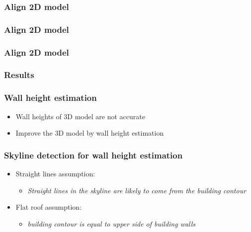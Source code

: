 \documentclass{beamer}
\begin{document}
\frame
{
	\frametitle{Align 2D model}
}


\frame
{
	\frametitle{Align 2D model}
}


\frame
{
	\frametitle{Align 2D model}
}

\frame
{
	\frametitle{Results}
}

\frame
{
	\frametitle{Wall height estimation}
	\begin{itemize}
	\item <+-| alert@+> Wall heights of 3D model are not accurate
	\item <+-| alert@+> Improve the 3D model by wall height estimation
	\end{itemize}
}

\frame
{
	\frametitle{Skyline detection for wall height estimation}
	\begin{itemize}
		\item <+-| alert@+> Straight lines assumption:
		\begin{itemize}
		\item <+-| alert@+> \emph{Straight lines in the skyline are likely to come from the
		building contour}
		\end{itemize}
		\item <+-| alert@+> Flat roof assumption:
		\begin{itemize}
		\item <+-| alert@+> \emph{building contour is equal to upper side of building walls}
		\end{itemize}
	\end{itemize}
}
\end{document}
